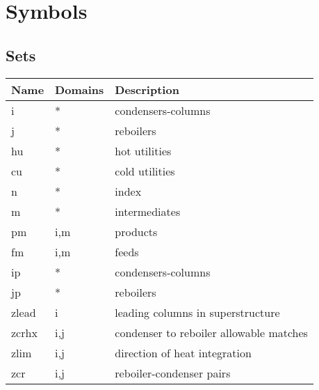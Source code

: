 \documentclass[11pt]{article}
\begin{document}
\section*{Symbols}


\subsection*{Sets}
\begin{tabularx}{\textwidth}{| l | l | X |}
\hline
\textbf{Name} & \textbf{Domains} & \textbf{Description}\\
\hline
\endhead

i & * & condensers-columns\\
j & * & reboilers\\
hu & * & hot utilities\\
cu & * & cold utilities\\
n & * & index\\
m & * & intermediates\\
pm & i,m & products\\
fm & i,m & feeds\\
ip & * & condensers-columns\\
jp & * & reboilers\\
zlead & i & leading columns in superstructure\\
zcrhx & i,j & condenser to reboiler allowable matches\\
zlim & i,j & direction of heat integration\\
zcr & i,j & reboiler-condenser pairs\\
\hline
\end{tabularx}
\end{document}

